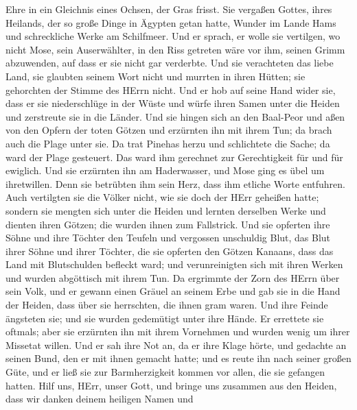 Ehre in ein Gleichnis eines Ochsen, der Gras frisst.  Sie
vergaßen Gottes, ihres Heilands, der so große Dinge in Ägypten getan
hatte,  Wunder im Lande Hams und schreckliche Werke am
Schilfmeer.  Und er sprach, er wolle sie vertilgen, wo
nicht Mose, sein Auserwählter, in den Riss getreten wäre vor ihm, seinen
Grimm abzuwenden, auf dass er sie nicht gar verderbte.  Und
sie verachteten das liebe Land, sie glaubten seinem Wort nicht
 und murrten in ihren Hütten; sie gehorchten der Stimme des
HErrn nicht.  Und er hob auf seine Hand wider sie, dass er
sie niederschlüge in der Wüste  und würfe ihren Samen unter
die Heiden und zerstreute sie in die Länder.  Und sie
hingen sich an den Baal-Peor und aßen von den Opfern der toten Götzen
 und erzürnten ihn mit ihrem Tun; da brach auch die Plage
unter sie.  Da trat Pinehas herzu und schlichtete die
Sache; da ward der Plage gesteuert.  Das ward ihm gerechnet
zur Gerechtigkeit für und für ewiglich.  Und sie erzürnten
ihn am Haderwasser, und Mose ging es übel um ihretwillen. 
Denn sie betrübten ihm sein Herz, dass ihm etliche Worte entfuhren.
 Auch vertilgten sie die Völker nicht, wie sie doch der
HErr geheißen hatte;  sondern sie mengten sich unter die
Heiden und lernten derselben Werke  und dienten ihren
Götzen; die wurden ihnen zum Fallstrick.  Und sie opferten
ihre Söhne und ihre Töchter den Teufeln  und vergossen
unschuldig Blut, das Blut ihrer Söhne und ihrer Töchter, die sie
opferten den Götzen Kanaans, dass das Land mit Blutschulden befleckt
ward;  und verunreinigten sich mit ihren Werken und wurden
abgöttisch mit ihrem Tun.  Da ergrimmte der Zorn des HErrn
über sein Volk, und er gewann einen Gräuel an seinem Erbe 
und gab sie in die Hand der Heiden, dass über sie herrschten, die ihnen
gram waren.  Und ihre Feinde ängsteten sie; und sie wurden
gedemütigt unter ihre Hände.  Er errettete sie oftmals;
aber sie erzürnten ihn mit ihrem Vornehmen und wurden wenig um ihrer
Missetat willen.  Und er sah ihre Not an, da er ihre Klage
hörte,  und gedachte an seinen Bund, den er mit ihnen
gemacht hatte; und es reute ihn nach seiner großen Güte, 
und er ließ sie zur Barmherzigkeit kommen vor allen, die sie gefangen
hatten.  Hilf uns, HErr, unser Gott, und bringe uns
zusammen aus den Heiden, dass wir danken deinem heiligen Namen und

